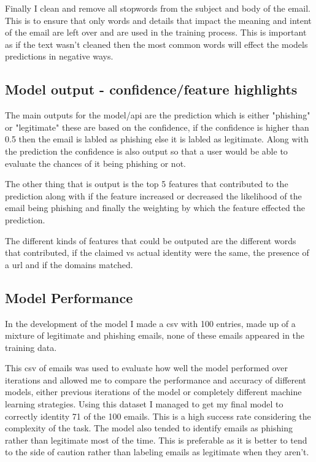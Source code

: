 \documentclass[a4paper,10pt]{article}
\begin{document}
Finally I clean and remove all stopwords from the subject and body of the email.
This is to ensure that only words and details that impact the meaning and intent
of the email are left over and are used in the training process. This is
important as if the text wasn't cleaned then the most common words will effect
the models predictions in negative ways. \par

\subsection{Model output - confidence/feature highlights}

The main outputs for the model/api are the prediction which is either "phishing"
or "legitimate" these are based on the confidence, if the confidence is higher
than 0.5 then the email is labled as phishing else it is labled as legitimate.
Along with the prediction the confidence is also output so that a user would be
able to evaluate the chances of it being phishing or not. \par

The other thing that is output is the top 5 features that contributed to the
prediction along with if the feature increased or decreased the likelihood of
the email being phishing and finally the weighting by which the feature effected
the prediction.\par

The different kinds of features that could be outputed are the different words
that contributed, if the claimed vs actual identity were the same, the presence
of a url and if the domains matched. \par

\subsection{Model Performance}

In the development of the model I made a csv with 100 entries, made up of a
mixture of legitimate and phishing emails, none of these emails appeared in the
training data. \par

This csv of emails was used to evaluate how well the model performed over
iterations and allowed me to compare the performance and accuracy of different
models, either previous iterations of the model or completely different machine
learning strategies. Using this dataset I managed to get my final model to
correctly identity 71 of the 100 emails. This is a high success rate considering
the complexity of the task. The model also tended to identify emails as phishing
rather than legitimate most of the time. This is preferable as it is better to
tend to the side of caution rather than labeling emails as legitimate when they
aren't. \par
\end{document}
